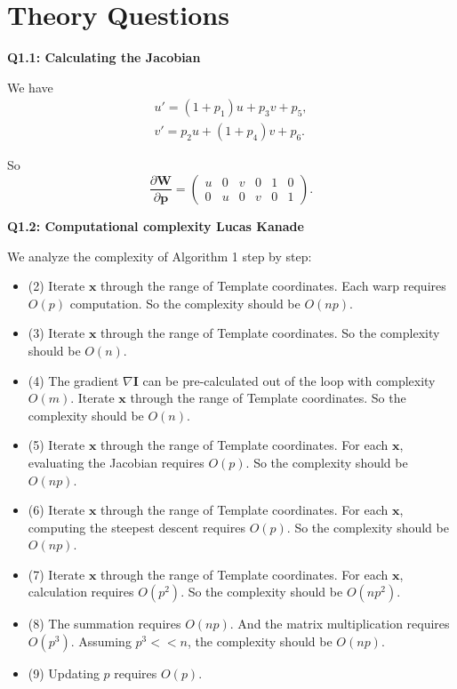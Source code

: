 \documentclass[
  course = {{16-720B Computer Vision}},
  quartile = {{1}},
  assignment = 6\ -\ Object\ Tracking\ in\ Videos,
  name = {{Kangle Deng}},
  email = {{kangled@andrew.cmu.edu}},
  firstexercise = 1
]{aga-homework}
\begin{document}
\section{Theory Questions}
\noindent\textbf{Q1.1: Calculating the Jacobian}

We have
\begin{equation*}
    \begin{aligned}
    u' = (1+p_1)u + p_3v + p_5, \\
    v' = p_2u + (1+p_4)v + p_6.
    \end{aligned}
\end{equation*}

So
\begin{equation*}
    \frac{\partial \mathbf{W}}{\partial \mathbf{p}} = \left(\begin{array}{cccccc}
       u  & 0 & v & 0 & 1 & 0 \\
       0  & u & 0 & v & 0 & 1
    \end{array}\right).
\end{equation*}

\noindent\textbf{Q1.2: Computational complexity Lucas Kanade}

We analyze the complexity of Algorithm 1 step by step:
\begin{itemize}
    \item (2) Iterate $\mathbf{x}$ through the range of Template coordinates. Each warp requires $O(p)$ computation. So the complexity should be $O(np)$.
    \item (3) Iterate $\mathbf{x}$ through the range of Template coordinates. So the complexity should be $O(n)$.
    \item (4) The gradient $\nabla \mathbf{I}$ can be pre-calculated out of the loop with complexity $O(m)$. Iterate $\mathbf{x}$ through the range of Template coordinates. So the complexity should be $O(n)$.
    \item (5) Iterate $\mathbf{x}$ through the range of Template coordinates. For each $\mathbf{x}$, evaluating the Jacobian requires $O(p)$. So the complexity should be $O(np)$.
    \item (6) Iterate $\mathbf{x}$ through the range of Template coordinates. For each $\mathbf{x}$, computing the steepest descent requires $O(p)$. So the complexity should be $O(np)$.
    \item (7) Iterate $\mathbf{x}$ through the range of Template coordinates. For each $\mathbf{x}$, calculation requires $O(p^2)$. So the complexity should be $O(np^2)$.
    \item (8) The summation requires $O(np)$. And the matrix multiplication requires $O(p^3)$. Assuming $p^3 << n$, the complexity should be $O(np)$.
    \item (9) Updating $p$ requires $O(p)$.
\end{itemize}
\end{document}
